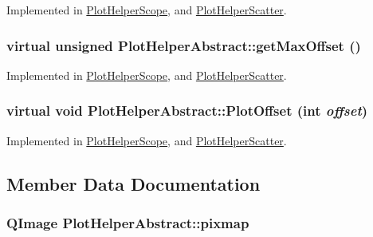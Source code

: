Implemented in \hyperlink{class_plot_helper_scope_14f9dd65241014d966dfade9ce51ade3}{PlotHelperScope}, and \hyperlink{class_plot_helper_scatter_0752a8d97f16327f14a63554ddf79c3a}{PlotHelperScatter}.\hypertarget{class_plot_helper_abstract_099ed5350c367a7afbd957fe3d777eab}{
\subsubsection[{getMaxOffset}]{\setlength{\rightskip}{0pt plus 5cm}virtual unsigned PlotHelperAbstract::getMaxOffset ()}}
\label{class_plot_helper_abstract_099ed5350c367a7afbd957fe3d777eab}




Implemented in \hyperlink{class_plot_helper_scope_a57366f18a378b4c7517ee46e21ab31b}{PlotHelperScope}, and \hyperlink{class_plot_helper_scatter_333fc1f9aa7a867b20b672ea475d704c}{PlotHelperScatter}.\hypertarget{class_plot_helper_abstract_f6e3d62673650c86bee9191cd8ca3800}{
\subsubsection[{PlotOffset}]{\setlength{\rightskip}{0pt plus 5cm}virtual void PlotHelperAbstract::PlotOffset (int {\em offset})}}
\label{class_plot_helper_abstract_f6e3d62673650c86bee9191cd8ca3800}




Implemented in \hyperlink{class_plot_helper_scope_841411e9c5faf41ee02b3c2e41ea8709}{PlotHelperScope}, and \hyperlink{class_plot_helper_scatter_d8329a5f7890a40448ef89bf32bc422e}{PlotHelperScatter}.

\subsection{Member Data Documentation}
\hypertarget{class_plot_helper_abstract_15631f94b85196d39757d3ab3a05b4ab}{
\subsubsection[{pixmap}]{\setlength{\rightskip}{0pt plus 5cm}QImage {\bf PlotHelperAbstract::pixmap}}}
\label{class_plot_helper_abstract_15631f94b85196d39757d3ab3a05b4ab}


